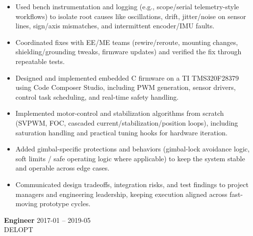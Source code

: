 \documentclass[11pt]{article}
\begin{document}
\begin{itemize}[leftmargin=*,noitemsep]
  \item Used bench instrumentation and logging (e.g., scope/serial telemetry-style workflows) to isolate root causes like oscillations, drift, jitter/noise on sensor lines, sign/axis mismatches, and intermittent encoder/IMU faults.
  
  \item Coordinated fixes with EE/ME teams (rewire/reroute, mounting changes, shielding/grounding tweaks, firmware updates) and verified the fix through repeatable tests.
  
  \item Designed and implemented embedded C firmware on a TI TMS320F28379 using Code Composer Studio, including PWM generation, sensor drivers, control task scheduling, and real-time safety handling.
  
  \item Implemented motor-control and stabilization algorithms from scratch (SVPWM, FOC, cascaded current/stabilization/position loops), including saturation handling and practical tuning hooks for hardware iteration.
  
  \item Added gimbal-specific protections and behaviors (gimbal-lock avoidance logic, soft limits / safe operating logic where applicable) to keep the system stable and operable across edge cases.
  
  \item Communicated design tradeoffs, integration risks, and test findings to project managers and engineering leadership, keeping execution aligned across fast-moving prototype cycles.
  
\end{itemize}

\vspace{4pt}

\textbf{ Engineer } \hfill 2017-01 -- 2019-05\\
DELOPT \\
\end{document}
